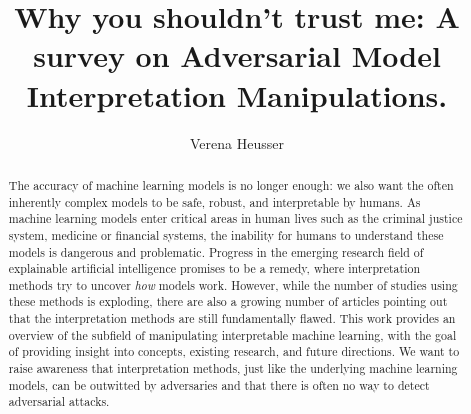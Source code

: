 \documentclass[sigconf]{acmart}
\begin{document}
\title{Why you shouldn't trust me: A survey on Adversarial Model Interpretation Manipulations.}

\author{Verena Heusser}


\begin{abstract}
  The accuracy of machine learning models is no longer enough: we also want the often inherently complex models to be safe, robust, and interpretable by humans. As machine learning models enter critical areas in human lives such as the criminal justice system, medicine or financial systems, the inability for humans to understand these models is dangerous and problematic. Progress in the emerging research field of explainable artificial intelligence promises to be a remedy, where interpretation methods try to uncover \textit{how} models work. However, while the number of studies using these methods is exploding, there are also a growing number of articles pointing out that the interpretation methods are still fundamentally flawed.   
  This work provides an overview of the subfield of manipulating interpretable machine learning, with the goal of providing insight into concepts, existing research, and future directions. We want to raise awareness that interpretation methods, just like the underlying machine learning models, can be outwitted by adversaries and that there is often no way to detect adversarial attacks.
  

\end{abstract}

\end{document}
